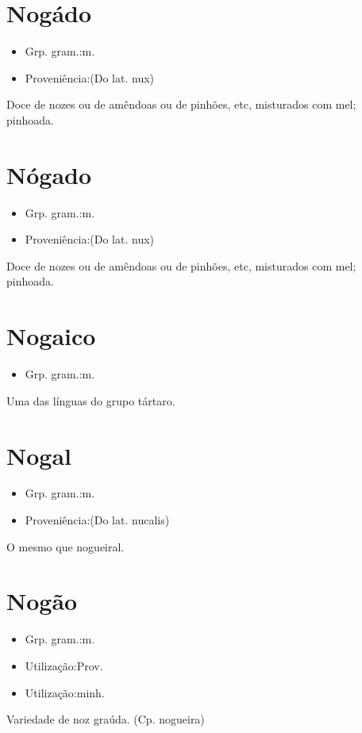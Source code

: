 \section{Nogádo}
\begin{itemize}
\item {Grp. gram.:m.}
\end{itemize}
\begin{itemize}
\item {Proveniência:(Do lat. \textunderscore nux\textunderscore )}
\end{itemize}
Doce de nozes ou de amêndoas ou de pinhões, etc, misturados com mel; pinhoada.
\section{Nógado}
\begin{itemize}
\item {Grp. gram.:m.}
\end{itemize}
\begin{itemize}
\item {Proveniência:(Do lat. \textunderscore nux\textunderscore )}
\end{itemize}
Doce de nozes ou de amêndoas ou de pinhões, etc, misturados com mel; pinhoada.
\section{Nogaico}
\begin{itemize}
\item {Grp. gram.:m.}
\end{itemize}
Uma das línguas do grupo tártaro.
\section{Nogal}
\begin{itemize}
\item {Grp. gram.:m.}
\end{itemize}
\begin{itemize}
\item {Proveniência:(Do lat. \textunderscore nucalis\textunderscore )}
\end{itemize}
O mesmo que \textunderscore nogueiral\textunderscore .
\section{Nogão}
\begin{itemize}
\item {Grp. gram.:m.}
\end{itemize}
\begin{itemize}
\item {Utilização:Prov.}
\end{itemize}
\begin{itemize}
\item {Utilização:minh.}
\end{itemize}
Variedade de noz graúda.
(Cp. \textunderscore nogueira\textunderscore )
